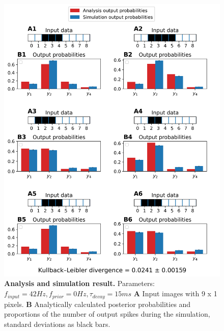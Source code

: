 \begin{figure}
  \includegraphics[width=\linewidth]{figures/1D/1D_42_0_15.png}
  \caption{\textbf{Analysis and simulation result. } Parameters: $f_{input} = 42 Hz, f_{prior} = 0 Hz, \tau_{decay} = 15 ms$ \textbf{A} Input images with 9 x 1 pixels. \textbf{B} Analytically calculated posterior probabilities and proportions of the number of output spikes during the simulation, standard deviations as black bars.}
  \label{fig:1D_42_0_15}
\end{figure}

